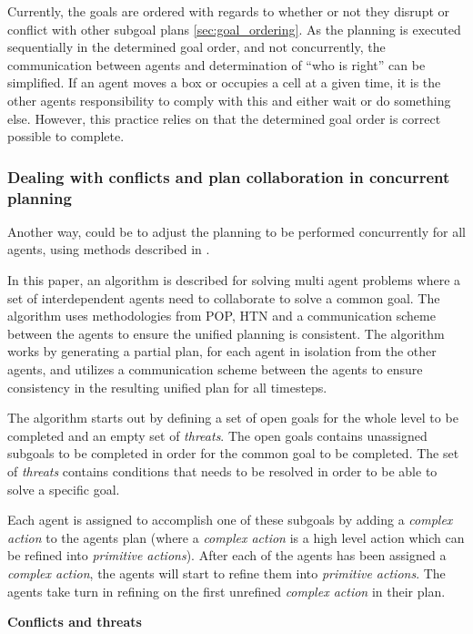 \documentclass[Main]{subfiles}
\begin{document}
Currently, the goals are ordered with regards to whether or not they disrupt or conflict with other subgoal plans \autoref{sec:goal_ordering}.
As the planning is executed sequentially in the determined goal order, and not concurrently, the communication between agents and determination of ``who is right'' can be simplified.
If an agent moves a box or occupies a cell at a given time, it is the other agents responsibility to comply with this and either wait or do something else.
However, this practice relies on that the determined goal order is correct possible to complete.


\subsubsection{Dealing with conflicts and plan collaboration in concurrent planning}

Another way, could be to adjust the planning to be performed concurrently for all agents, using methods described in \citep{pellier2007unified}.

In this paper, an algorithm is described for solving multi agent problems where a set of interdependent agents need to collaborate to solve a common goal.
The algorithm uses methodologies from POP, HTN and a communication scheme between the agents to ensure the unified planning is consistent.
The algorithm works by generating a partial plan, for each agent in isolation from the other agents, and utilizes a communication scheme between the agents to ensure consistency in the resulting unified plan for all timesteps.

The algorithm starts out by defining a set of open goals for the whole level to be completed and an empty set of \textit{threats}.
The open goals contains unassigned subgoals to be completed in order for the common goal to be completed.
The set of \textit{threats} contains conditions that needs to be resolved in order to be able to solve a specific goal.

Each agent is assigned to accomplish one of these subgoals by adding a \textit{complex action} to the agents plan (where a \textit{complex action} is a high level action which can be refined into \textit{primitive actions}).
After each of the agents has been assigned a \textit{complex action}, the agents will start to refine them into \textit{primitive actions}.
The agents take turn in refining on the first unrefined \textit{complex action} in their plan.


\textbf{Conflicts and threats}
\end{document}
